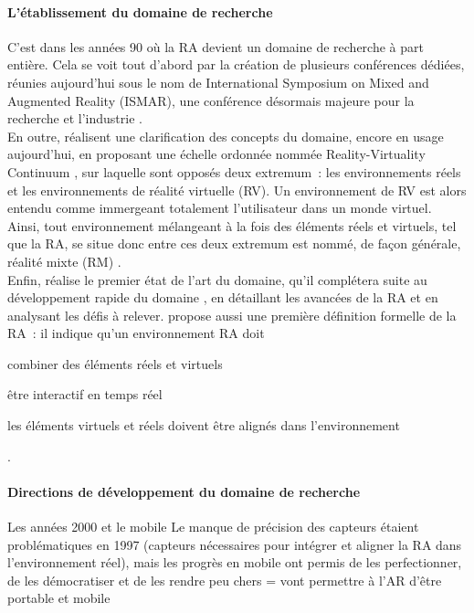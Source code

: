 \paragraph*{L'établissement du domaine de recherche}
C'est dans les années 90 où la RA devient un domaine de recherche à part entière. Cela se voit tout d'abord par la création de plusieurs conférences dédiées, réunies aujourd'hui sous le nom de International Symposium on Mixed and Augmented Reality (ISMAR), une conférence désormais majeure pour la recherche et l'industrie \citep{AzumaBaillotBehringerEtAl2001}.\\
En outre, \citet{MilgramKishino1994} réalisent une clarification des concepts du domaine, encore en usage aujourd'hui, en proposant une échelle ordonnée nommée \foreignlanguage{english}{Reality-Virtuality Continuum} , sur laquelle sont opposés deux extremum~: les environnements réels et les environnements de réalité virtuelle (RV). Un environnement de RV est alors entendu comme immergeant totalement l'utilisateur dans un monde virtuel. Ainsi, tout environnement mélangeant à la fois des éléments réels et virtuels, tel que la RA, se situe donc entre ces deux extremum est nommé, de façon générale, réalité mixte (RM) \citep{MilgramKishino1994}.\\
Enfin, \citet{Azuma1997} réalise le premier état de l'art du domaine, qu'il complétera suite au développement rapide du domaine \citep{AzumaBaillotBehringerEtAl2001}, en détaillant les avancées de la RA et en analysant les défis à relever. \citet{Azuma1997} propose aussi une première définition formelle de la RA~: il indique qu'un environnement RA doit 
\begin{enumerate*}[label=\emph{\arabic*})]
\item combiner des éléments réels et virtuels
\item être interactif en temps réel
\item les éléments virtuels et réels doivent être alignés dans l'environnement
\end{enumerate*}.


\paragraph*{Directions de développement du domaine de recherche}
Les années 2000 et le mobile \cite{HuangHuiPeyloEtAl2013}
Le manque de précision des capteurs étaient problématiques en 1997 \citep{Azuma1997} (capteurs nécessaires pour intégrer et aligner la RA dans l'environnement réel), mais les progrès en mobile ont permis de les perfectionner, de les démocratiser et de les rendre peu chers = vont permettre à l'AR d'être portable et mobile \cite{VanKrevelenPoelman2010}


